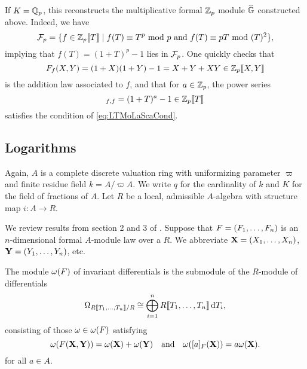 \documentclass[../main.tex]{subfiles}
\begin{document}
\begin{xpl}
  If $K = \mathbb{Q}_p$, this reconstructs the multiplicative formal 
  $\mathbb{Z}_p$ module $\widehat{\mathbb{G}}$ constructed above. Indeed, we have 
  \begin{equation*}
    \mathcal{F}_p = \{f \in \mathbb{Z}_p\llbracket T \rrbracket \mid f(T) \equiv T^p \text{ mod } p
    \text{ and } f(T) \equiv pT \text{ mod } (T)^2 \},
  \end{equation*}
  implying that $f(T) = (1+T)^p-1$ lies in $\mathcal{F}_p$.  
  One quickly checks that 
  \begin{equation*}
    F_f(X,Y) = (1+X)(1+Y) - 1 = X + Y + XY \in \mathbb{Z}_p \llbracket X,Y \rrbracket
  \end{equation*}
  is the addition law associated to $f$, and that 
  for $a \in \mathbb{Z}_p$, the power series
  \begin{equation*}
    [a]_{f,f} = (1+T)^{a} - 1 \in \Z_p \llbr T \rrbr
  \end{equation*}
  satisfies the condition of \eqref{eq:LTMoLaScaCond}. 
\end{xpl}


\subsection{Logarithms} %
\label{sub:Logarithms}
Again, $A$ is a complete discrete valuation ring with uniformizing parameter 
$\varpi$ and finite residue field $k = A/\varpi A$. We write $q$ for the cardinality of 
$k$ and $K$ for the field of fractions of $A$. Let $R$ be a local,
admissible $A$-algebra with structure map $i: A \to R$.

We review results from section
2 and 3 of \cite{hopkins1994equivariant}. 
Suppose that ${F} = (F_1, \dots, F_n)$ is an $n$-dimensional formal $A$-module
law over a $R$. We abbreviate $\mathbf{X} = (X_1, \dots, X_n)$, $\mathbf{Y} = (Y_1,
\dots, Y_n)$, etc.

\begin{defi}
  The module $\omega({F})$ of invariant differentials is the submodule of the
  $R$-module of differentials
  \begin{equation*}
    \Omega_{R\llbracket T_1, \dots, T_n \rrbracket/R} \cong \bigoplus_{i=1}^n R\llbracket T_1, \dots, T_n
    \rrbracket \, \mathrm{d} T_i,
  \end{equation*}
  consisting of those $\omega \in \omega({F})$ satisfying
  \begin{equation}\label{eq:diffcond}
    \omega({F}(\mathbf{X},\mathbf{Y})) = \omega(\mathbf{X}) + \omega(\mathbf{Y})\quad \text{and} \quad
    \omega([a]_{F}(\mathbf{X})) = a\omega(\mathbf{X}).
  \end{equation} 
  for all $a \in A$. 
\end{defi}
\end{document}
